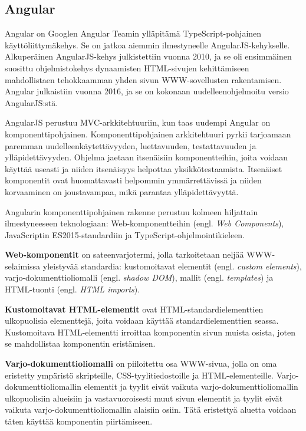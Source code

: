 \documentclass[utf8]{gradu3}
\begin{document}
\subsection{Angular}

Angular on Googlen Angular Teamin ylläpitämä TypeScript-pohjainen käyttöliittymäkehys. Se on jatkoa aiemmin ilmestyneelle AngularJS-kehykselle. Alkuperäinen AngularJS-kehys julkistettiin vuonna 2010, ja se oli ensimmäinen suosittu ohjelmistokehys dynaamisten HTML-sivujen kehittämiseen mahdollistaen tehokkaamman yhden sivun WWW-sovellusten rakentamisen. Angular julkaistiin vuonna 2016, ja se on kokonaan uudelleenohjelmoitu versio AngularJS:stä.

AngularJS perustuu MVC-arkkitehtuuriin, kun taas uudempi Angular on komponenttipohjainen. Komponenttipohjainen arkkitehtuuri pyrkii tarjoamaan paremman uudelleenkäytettävyyden, luettavuuden, testattavuuden ja ylläpidettävyyden. Ohjelma jaetaan itsenäisiin komponentteihin, joita voidaan käyttää useasti ja niiden itsenäisyys helpottaa yksikkötestaamista. Itsenäiset komponentit ovat huomattavasti helpommin ymmärrettävissä ja niiden korvaaminen on joustavampaa, mikä parantaa ylläpidettävyyttä. \parencite[]{good-and-bad-angular} 

Angularin komponenttipohjainen rakenne perustuu kolmeen hiljattain ilmestyneeseen teknologiaan: Web-komponentteihin (engl. \textit{Web Components}), JavaScriptin ES2015-standardiin ja TypeScript-ohjelmointikieleen.

\textbf{Web-komponentit} on sateenvarjotermi, jolla tarkoitetaan neljää WWW-selaimissa yleistyvää standardia: kustomoitavat elementit (engl. \textit{custom elements}), varjo-dokumenttioliomalli (engl. \textit{shadow DOM}), mallit (engl. \textit{templates}) ja HTML-tuonti (engl. \textit{HTML imports}). 

\textbf{Kustomoitavat HTML-elementit} ovat HTML-standardielementtien ulkopuolisia elementtejä, joita voidaan käyttää standardielementtien seassa. Kustomoitava HTML-elementti irroittaa komponentin sivun muista osista, joten se mahdollistaa komponentin eristämisen. 

\textbf{Varjo-dokumenttioliomalli} on piiloitettu osa WWW-sivua, jolla on oma eristetty ympäristö skripteille, CSS-tyylitiedostoille ja HTML-elementeille. Varjo-dokumenttioliomallin elementit ja tyylit eivät vaikuta varjo-dokumenttioliomallin ulkopuolisiin alueisiin ja vastavuoroisesti muut sivun elementit ja tyylit eivät vaikuta varjo-dokumenttioliomallin alaisiin osiin. Tätä eristettyä aluetta voidaan täten käyttää komponentin piirtämiseen. 
\end{document}
